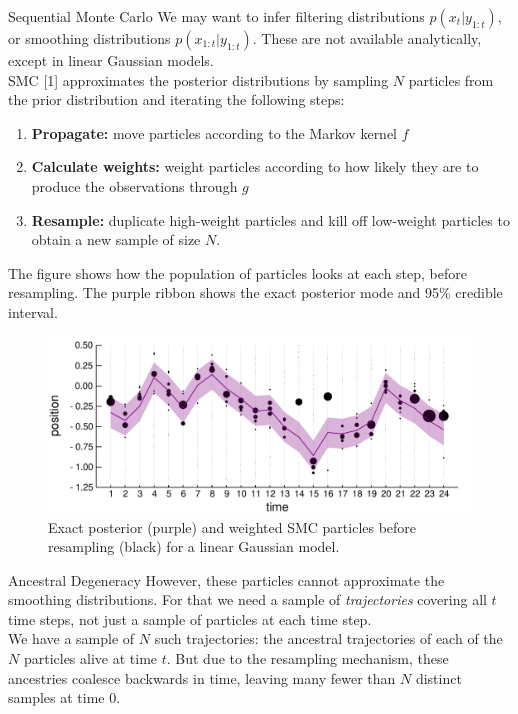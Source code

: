 \documentclass[final, 12pt]{beamer}
\newlength{\colwidth}
\begin{document}
\begin{frame}
\begin{columns}
\begin{column}{\colwidth}
\begin{block}{Sequential Monte Carlo}
We may want to infer filtering distributions $p(x_t | y_{1:t})$, or smoothing distributions $p(x_{1:t} | y_{1:t})$. 
These are not available analytically, except in linear Gaussian models. \\[12pt]

SMC [1] approximates the posterior distributions by sampling $N$ particles from the prior distribution and iterating the following steps:
\begin{enumerate}
\item \textbf{Propagate:} move particles according to the Markov kernel $f$
\item \textbf{Calculate weights:} weight particles according to how likely they are to produce the observations through $g$
\item \textbf{Resample:} duplicate high-weight particles and kill off low-weight particles to obtain a new sample of size $N$.
\end{enumerate}

\vspace*{10pt}

The figure shows how the population of particles looks at each step, before resampling. The purple ribbon shows the exact posterior mode and 95\% credible interval.
\begin{figure}
\includegraphics[width=\colwidth]{smc_kalman.pdf}
\caption{Exact posterior (purple) and weighted SMC particles before resampling (black) for a linear Gaussian model.}
\end{figure}
\end{block}

\begin{block}{Ancestral Degeneracy}
However, these particles cannot approximate the smoothing distributions. For that we need a sample of \emph{trajectories} covering all $t$ time steps, not just a sample of particles at each time step.\\[10pt]

We have a sample of $N$ such trajectories: the ancestral trajectories of each of the $N$ particles alive at time $t$.
But due to the resampling mechanism, these ancestries coalesce backwards in time, leaving many fewer than $N$ distinct samples at time 0. 


\end{block}
\end{column}
\end{columns}
\end{frame}
\end{document}
